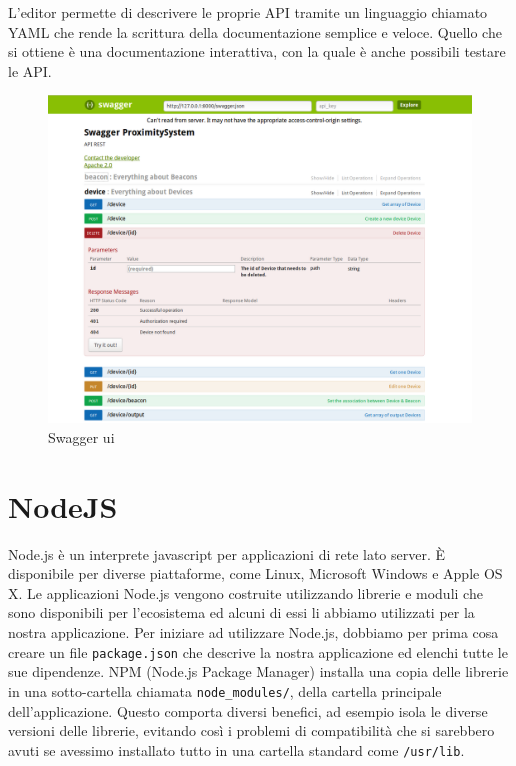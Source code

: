 L'editor permette di descrivere le proprie API tramite un linguaggio chiamato YAML
che rende la scrittura della documentazione semplice e veloce.
Quello che si ottiene è una documentazione interattiva, con la quale è anche possibili testare le API. 
\begin{figure}[htbp]
\centering
\includegraphics[scale=0.333]{Immagini/swagger-ui.png}
\caption{Swagger ui} 
\end{figure}

\newpage
\section{NodeJS}
Node.js\cite{node} è un interprete javascript per applicazioni di rete lato server. 
È disponibile per diverse piattaforme, come Linux, Microsoft Windows e Apple OS X.
Le applicazioni Node.js vengono costruite utilizzando librerie e moduli che sono disponibili per l'ecosistema ed alcuni di essi li abbiamo utilizzati per la nostra applicazione.
Per iniziare ad utilizzare Node.js, dobbiamo per prima cosa creare un file \texttt{package.json} che descrive la nostra applicazione ed elenchi tutte le sue dipendenze.
NPM (Node.js Package Manager) installa una copia delle librerie in una sotto-cartella chiamata \texttt{node\_modules/}, della cartella principale dell'applicazione. 
Questo comporta diversi benefici, ad esempio isola le diverse versioni delle librerie, evitando così i problemi di compatibilità che si sarebbero avuti se avessimo installato tutto in una cartella standard come \texttt{/usr/lib}.

